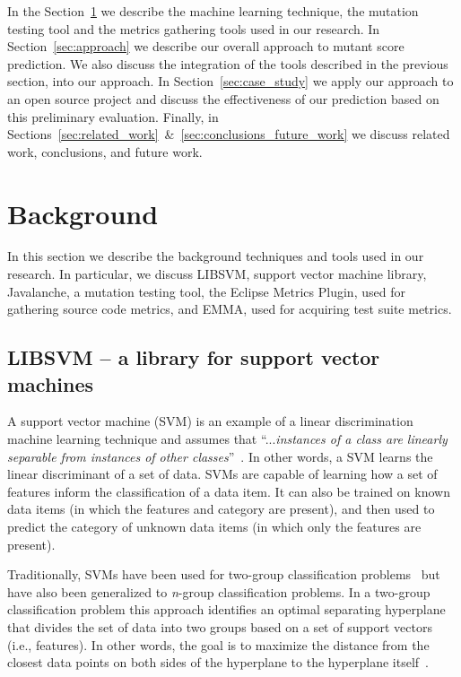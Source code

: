 \documentclass[conference]{IEEEtran}
\begin{document}
In the Section~\ref{sec:background} we describe the machine learning technique, the mutation testing tool and the metrics gathering tools used in our research. In Section~\ref{sec:approach} we describe our overall approach to mutant score prediction. We also discuss the integration of the tools described in the previous section, into our approach. In Section~\ref{sec:case_study} we apply our approach to an open source project and discuss the effectiveness of our prediction based on this preliminary evaluation. Finally, in Sections~\ref{sec:related_work}~\&~\ref{sec:conclusions_future_work} we discuss related work, conclusions, and future work.


\section{Background}
\label{sec:background}
In this section we describe the background techniques and tools used in our research. In particular, we discuss LIBSVM, support vector machine library, Javalanche, a mutation testing tool, the Eclipse Metrics Plugin, used for gathering source code metrics, and EMMA, used for acquiring test suite metrics.


\subsection{LIBSVM -- a library for support vector machines}
\label{subsec:libsvm}
A support vector machine (SVM) is an example of a linear discrimination machine learning technique and assumes that ``...\emph{instances of a class are linearly separable from instances of other classes}''~\cite{ALP04}. In other words, a SVM learns the linear discriminant of a set of data. SVMs are capable of learning how a set of features inform the classification of a data item. It can also be trained on known data items (in which the features and category are present), and then used to predict the category of  unknown data items (in which only the features are present).

Traditionally, SVMs have been used for two-group classification problems~\cite{CV95} but have also been generalized to \emph{n}-group classification problems. In a two-group classification problem this approach identifies an optimal separating hyperplane that divides the set of data into two groups based on a set of support vectors (i.e., features). In other words, the goal is to maximize the distance from the closest data points on both sides of the hyperplane to the hyperplane itself~\cite{ALP04}.
\end{document}
